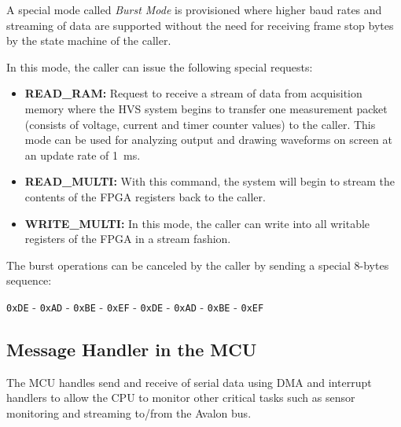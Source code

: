 A special mode called \emph{Burst Mode} is provisioned where higher
baud rates and streaming of data are supported without the need for receiving
frame stop bytes by the state machine of the caller.

In this mode, the caller can issue the following special requests:

\begin{itemize}[topsep=8pt,itemsep=4pt,partopsep=4pt, parsep=4pt]
    \item \textbf{READ\_RAM:} Request to receive a stream of data from
    acquisition memory where the \acs{HVS} system begins to transfer
    one measurement packet (consists of voltage, current and timer counter
    values) to the caller. This mode can be used for analyzing output and
    drawing waveforms on screen at an update rate of \SI{1}{\milli\second}.

    \item \textbf{READ\_MULTI:} With this command, the system will begin
    to stream the contents of the FPGA registers back to the caller.

    \item \textbf{WRITE\_MULTI:} In this mode, the caller can write into
    all writable registers of the FPGA in a stream fashion.

\end{itemize}

The burst operations can be canceled by the caller by sending a
special 8-bytes sequence:
\begin{center}
    \texttt{0xDE} - \texttt{0xAD} - \texttt{0xBE} - \texttt{0xEF} - \texttt{0xDE} - \texttt{0xAD} - \texttt{0xBE} - \texttt{0xEF}
\end{center}

\subsection{Message Handler in the \acs{MCU}}
\label{subsec:mcu-msg-handler}

The \acs{MCU} handles send and receive of serial data using \acs{DMA} and
interrupt handlers to allow the \acs{CPU} to monitor other critical tasks
such as sensor monitoring and streaming to/from the Avalon bus.

